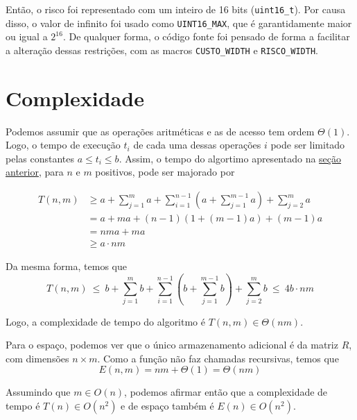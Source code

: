 Então, o risco foi representado com um inteiro de 16 bits (\texttt{uint16\_t}). Por causa disso, o valor de infinito foi usado como \texttt{UINT16_MAX}, que é garantidamente maior ou igual a $2^{16}$. De qualquer forma, o código fonte foi pensado de forma a facilitar a alteração dessas restrições, com as macros \texttt{CUSTO\_WIDTH} e \texttt{RISCO\_WIDTH}.

\section{Complexidade}

Podemos assumir que as operações aritméticas e as de acesso tem ordem $\Theta(1)$. Logo, o tempo de execução $t_i$ de cada uma dessas operações $i$ pode ser limitado pelas constantes $a \leq t_i \leq b$. Assim, o tempo do algortimo apresentado na \hyperref[sec:alg]{seção anterior}, para $n$ e $m$ positivos, pode ser majorado por

\begin{align*}
    T(n, m) &\geq a + \sum_{j = 1}^m a + \sum_{i = 1}^{n - 1} \left( a + \sum_{j = 1}^{m - 1} a \right) + \sum_{j = 2}^m a \\
    &= a + m a + (n - 1) (1 + (m - 1) a) + (m - 1) a \\
    &= n m a + m a \\
    &\geq a \cdot n m
\end{align*}

Da mesma forma, temos que
\[
    T(n, m) ~\leq~ b + \sum_{j = 1}^m b + \sum_{i = 1}^{n - 1} \left( b + \sum_{j = 1}^{m - 1} b \right) + \sum_{j = 2}^m b ~\leq~ 4 b \cdot n m
\]

Logo, a complexidade de tempo do algoritmo é $T(n, m) \in \Theta(n m)$.

Para o espaço, podemos ver que o único armazenamento adicional é da matriz $R$, com dimensões $n \times m$. Como a função não faz chamadas recursivas, temos que
\[
    E(n, m) = n m + \Theta(1) = \Theta(n m)
\]

Assumindo que $m \in O(n)$, podemos afirmar então que a complexidade de tempo é $T(n) \in O\left(n^2\right)$ e de espaço também é $E(n) \in O\left(n^2\right)$.
